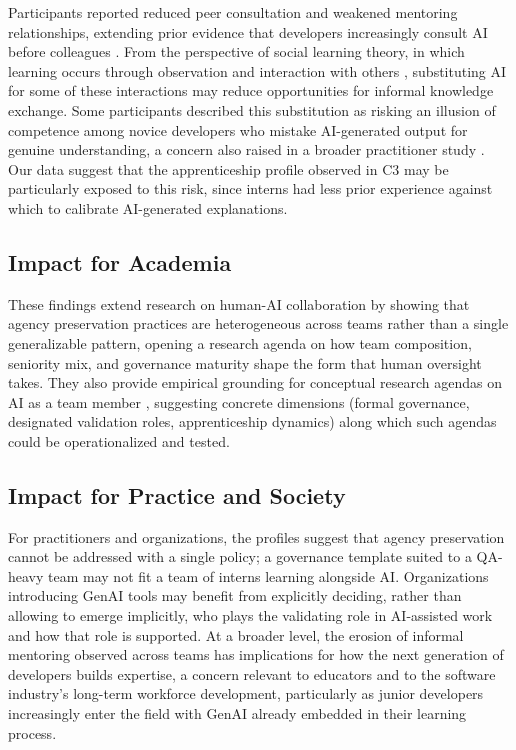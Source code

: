 \documentclass[10pt,journal,compsoc]{IEEEtran}
\begin{document}
Participants reported reduced peer consultation and weakened mentoring relationships, extending prior evidence that developers increasingly consult AI before colleagues \cite{salomon2026}. From the perspective of social learning theory, in which learning occurs through observation and interaction with others \cite{bandura1977}, substituting AI for some of these interactions may reduce opportunities for informal knowledge exchange. Some participants described this substitution as risking an illusion of competence among novice developers who mistake AI-generated output for genuine understanding, a concern also raised in a broader practitioner study \cite{zacharias2026}. Our data suggest that the apprenticeship profile observed in C3 may be particularly exposed to this risk, since interns had less prior experience against which to calibrate AI-generated explanations.

\subsection{Impact for Academia}

These findings extend research on human-AI collaboration by showing that agency preservation practices are heterogeneous across teams rather than a single generalizable pattern, opening a research agenda on how team composition, seniority mix, and governance maturity shape the form that human oversight takes. They also provide empirical grounding for conceptual research agendas on AI as a team member \cite{seeber2020}, suggesting concrete dimensions (formal governance, designated validation roles, apprenticeship dynamics) along which such agendas could be operationalized and tested.

\subsection{Impact for Practice and Society}

For practitioners and organizations, the profiles suggest that agency preservation cannot be addressed with a single policy; a governance template suited to a QA-heavy team may not fit a team of interns learning alongside AI. Organizations introducing GenAI tools may benefit from explicitly deciding, rather than allowing to emerge implicitly, who plays the validating role in AI-assisted work and how that role is supported. At a broader level, the erosion of informal mentoring observed across teams has implications for how the next generation of developers builds expertise, a concern relevant to educators and to the software industry's long-term workforce development, particularly as junior developers increasingly enter the field with GenAI already embedded in their learning process.
\end{document}
